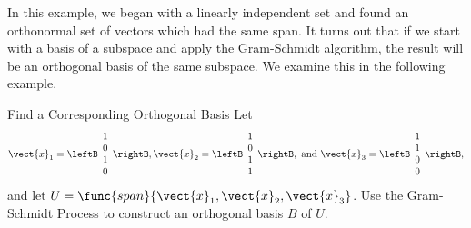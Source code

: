 In this example, we began with a linearly independent set and found an orthonormal set of vectors which had the same span. It turns out that if we start with a basis of a subspace and apply the Gram-Schmidt algorithm, the result will be an orthogonal basis of the same subspace. We examine this in the following example. 

\begin{example}{Find a Corresponding Orthogonal Basis}\label{exa:orthogonalbasis}
Let
\[ \vect{x}_1=\leftB\begin{array}{c} 1\\ 0\\ 1\\ 0 \end{array}\rightB,
\vect{x}_2=\leftB\begin{array}{c} 1\\ 0\\ 1\\ 1 \end{array}\rightB,
\mbox{ and }
\vect{x}_3=\leftB\begin{array}{c} 1\\ 1\\ 0\\ 0 \end{array}\rightB,\]
and let $U=\func{span}\{\vect{x}_1, \vect{x}_2,\vect{x}_3\}$. Use the Gram-Schmidt Process
to construct an orthogonal basis $B$ of $U$. 
\end{example}

